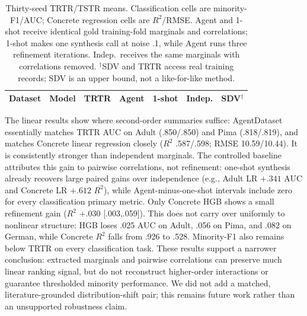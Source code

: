 \documentclass[letterpaper]{article} %
\begin{document}
\begin{table}[t]
\centering
\scriptsize
\setlength{\tabcolsep}{1.3pt}
\begin{tabular}{llrrrrr}
\toprule
Dataset & Model & TRTR & Agent & 1-shot & Indep. & SDV$^\dagger$ \\
\midrule
%
\end{tabular}
\caption{Thirty-seed TRTR/TSTR means. Classification cells are minority-F1/AUC;
Concrete regression cells are $R^2$/RMSE. Agent and 1-shot receive identical
gold training-fold marginals and correlations; 1-shot makes one synthesis call
at noise .1, while Agent runs three refinement iterations. Indep.\ receives the
same marginals with correlations removed. $^\dagger$SDV and TRTR access real
training records; SDV is an upper bound, not a like-for-like method.}
\label{tab:empirical}
\end{table}

The linear results show where second-order summaries suffice: AgentDataset
essentially matches TRTR AUC on Adult (.850/.850) and Pima (.818/.819), and
matches Concrete linear regression closely ($R^2$ .587/.598; RMSE 10.59/10.44).
It is consistently stronger than independent marginals. The controlled baseline
attributes this gain to pairwise correlations, not refinement: one-shot
synthesis already recovers large paired gains over independence (e.g., Adult LR
$+.341$ AUC and Concrete LR $+.612$ $R^2$), while Agent-minus-one-shot intervals
include zero for every classification primary metric. Only Concrete HGB shows a
small refinement gain ($R^2$ $+.030$ [.003,.059]). This does not carry
over uniformly to nonlinear structure: HGB loses .025 AUC on Adult, .056 on
Pima, and .082 on German, while Concrete $R^2$ falls from .926 to .528.
Minority-F1 also remains below TRTR on every classification task. These results
support a narrower conclusion: extracted marginals and pairwise correlations
can preserve much linear ranking signal, but do not reconstruct higher-order
interactions or guarantee thresholded minority performance. We did not add a
matched, literature-grounded distribution-shift pair; this remains future work
rather than an unsupported robustness claim.
\end{document}
